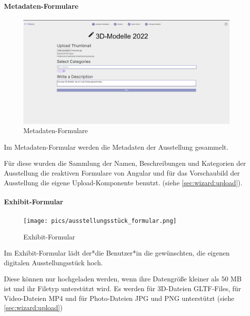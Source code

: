 \paragraph{Metadaten-Formulare}
\begin{figure}[ht]
    \centering
    \includegraphics[scale=0.2]{pics/metadata_formular.png}
    \caption{Metadaten-Formulare}
\end{figure}
Im Metadaten-Formular werden die Metadaten der Ausstellung gesammelt.


Für diese wurden die Sammlung der Namen, Beschreibungen und Kategorien der Ausstellung die reaktiven Formulare von Angular und für das Vorschaubild der Ausstellung die eigene Upload-Komponente benutzt. (siehe \ref{sec:wizard:upload}).


\paragraph{Exhibit-Formular}
\begin{figure}[ht]
    \centering
    \texttt{[image: pics/ausstellungsstück\_formular.png]}
    \caption{Exhibit-Formular}
\end{figure}
Im Exhibit-Formular lädt der*die Benutzer*in die gewünschten, die eigenen digitalen Ausstellungsstück hoch.

Diese können nur hochgeladen werden, wenn ihre Datengröße kleiner als 50 MB ist und ihr Filetyp unterstützt wird. Es werden für 3D-Dateien GLTF-Files, für Video-Dateien MP4 und für Photo-Dateien JPG und PNG unterstützt (siehe \ref{sec:wizard:upload})

